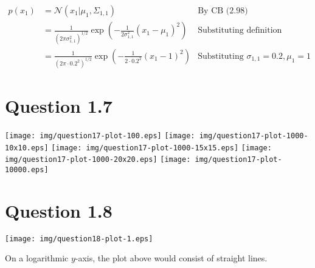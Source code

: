 \begin{align*}
  p(x_1) &= \mathcal{N}(x_1|\mu_1,\Sigma_{1,1}) & \text{By CB (2.98)}\\
  &=
  \frac{1}{(2\pi\sigma_{1,1}^2)^{1/2}}\exp\left({-\frac{1}{2\sigma_{1,1}^2}(x_1-\mu_1)^2}\right)
  & \text{Substituting definition} \\
  &=
  \frac{1}{(2\pi\cdot 0.2^2)^{1/2}}\exp\left({-\frac{1}{2\cdot0.2^2}(x_1-1)^2}\right)
  & \text{Substituting $\sigma_{1,1}=0.2,\mu_1=1$}
\end{align*}

\section*{Question 1.7}

\texttt{[image: img/question17-plot-100.eps]}
\texttt{[image: img/question17-plot-1000-10x10.eps]}
\texttt{[image: img/question17-plot-1000-15x15.eps]}
\texttt{[image: img/question17-plot-1000-20x20.eps]}
\texttt{[image: img/question17-plot-10000.eps]}

\section*{Question 1.8}


\texttt{[image: img/question18-plot-1.eps]}

On a logarithmic $y$-axis, the plot above would consist of straight
lines.
